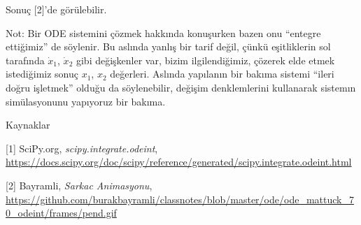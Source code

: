\documentclass[12pt,fleqn]{article}\usepackage{../../common}
\begin{document}
Sonuç [2]'de görülebilir.

Not: Bir ODE sistemini çözmek hakkında konuşurken bazen onu ``entegre
ettiğimiz'' de söylenir. Bu aslında yanlış bir tarif değil, çünkü
eşitliklerin sol tarafında $\dot{x}_1$, $\dot{x}_2$ gibi değişkenler var,
bizim ilgilendiğimiz, çözerek elde etmek istediğimiz sonuç $x_1$, $x_2$
değerleri. Aslında yapılanın bir bakıma sistemi ``ileri doğru işletmek''
olduğu da söylenebilir, değişim denklemlerini kullanarak sistemın
simülasyonunu yapıyoruz bir bakıma.

Kaynaklar

[1] SciPy.org, {\em scipy.integrate.odeint}, \url{https://docs.scipy.org/doc/scipy/reference/generated/scipy.integrate.odeint.html}

[2] Bayramli, {\em Sarkac Animasyonu}, \url{https://github.com/burakbayramli/classnotes/blob/master/ode/ode_mattuck_70_odeint/frames/pend.gif}
\end{document}
